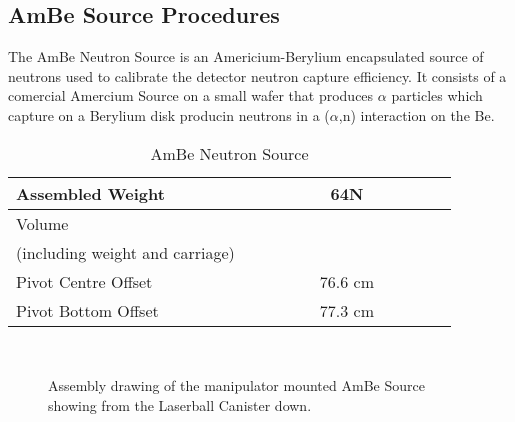 

  
\subsection{AmBe Source Procedures}


 The AmBe Neutron Source is an Americium-Berylium encapsulated source
of neutrons used to calibrate the detector neutron capture efficiency.
It consists of a comercial Amercium Source on a small wafer that produces
$\alpha$ particles which capture on a Berylium disk producin neutrons
in a ($\alpha$,n) interaction on the Be.  


\begin{table}[htb]
\begin{center}
\begin{tabular}{|l|c|}
\hline
Assembled Weight & ~~~~~~~~ 64N ~~~~~~~~\\
\hline
Volume           & ~~~~~~~~~~~~~~~~~~~~~\\
(including weight and carriage) & \\
\hline
Pivot Centre Offset & 76.6 cm\\
\hline
Pivot Bottom Offset & 77.3 cm\\
\hline
\end{tabular}
\caption[AmBe Neutron Source]
  {AmBe Neutron Source
  }
\end{center}
\end{table}



\clearpage
\begin{figure}
\begin{center}
\epsfxsize=7in
~\\
\caption[Assembly drawing of the manipulator mounted AmBe Source]
        {Assembly drawing of the manipulator mounted AmBe Source 
         showing from the Laserball Canister down.
        } 
        
\end{center}
\end{figure}




\clearpage


